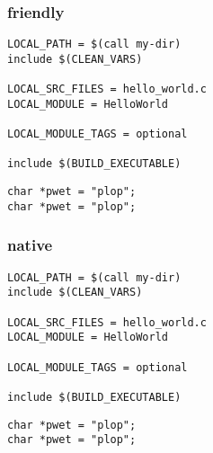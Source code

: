 \begin{frame}[fragile]
\frametitle{friendly}
\begin{verbatim}
LOCAL_PATH = $(call my-dir)
include $(CLEAN_VARS)

LOCAL_SRC_FILES = hello_world.c
LOCAL_MODULE = HelloWorld

LOCAL_MODULE_TAGS = optional

include $(BUILD_EXECUTABLE)
\end{verbatim}
\begin{verbatim}
char *pwet = "plop";
char *pwet = "plop";
\end{verbatim}
\end{frame}

\begin{frame}[fragile]
\frametitle{native}
\begin{verbatim}
LOCAL_PATH = $(call my-dir)
include $(CLEAN_VARS)

LOCAL_SRC_FILES = hello_world.c
LOCAL_MODULE = HelloWorld

LOCAL_MODULE_TAGS = optional

include $(BUILD_EXECUTABLE)
\end{verbatim}
\begin{verbatim}
char *pwet = "plop";
char *pwet = "plop";
\end{verbatim}
\end{frame}
